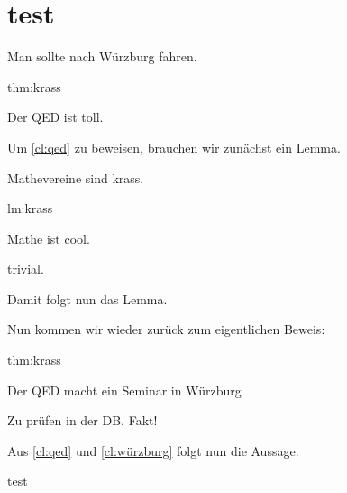 \documentclass[german]{article}
\begin{document}
\section{test}

\begin{theorem}\label{thm:krass}
    Man sollte nach Würzburg fahren.
\end{theorem}

\begin{rproof}{thm:krass}
    \begin{claim}\label{cl:qed}
       Der QED ist toll.
   \end{claim}
   Um \autoref{cl:qed} zu beweisen, brauchen wir zunächst ein Lemma. 
\end{rproof}

\begin{lemma}\label{lm:krass}
    Mathevereine sind krass.
\end{lemma}

\begin{rproof}{lm:krass}
    \begin{claim}
        Mathe ist cool.
    \end{claim}
    \begin{subproof}
        trivial.
    \end{subproof}
    Damit folgt nun das Lemma.
\end{rproof}

Nun kommen wir wieder zurück zum eigentlichen Beweis:

\begin{rproof}{thm:krass}
    \begin{claim}\label{cl:würzburg}
        Der QED macht ein Seminar in Würzburg
    \end{claim}
    \begin{subproof}
        Zu prüfen in der DB. Fakt!
    \end{subproof}
Aus \autoref{cl:qed}   und \autoref{cl:würzburg} folgt nun die Aussage. 
\end{rproof}
test
\end{document}

